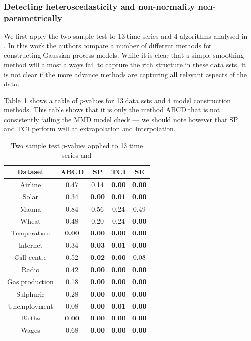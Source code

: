 \documentclass{article} %
\begin{document}
\subsubsection{Detecting heteroscedasticity and non-normality non-parametrically}

We first apply the two sample test to 13 time series and 4 algorithms analysed in .
In this work the authors compare a number of different methods for constructing Gaussian process models.
While it is clear that a simple smoothing method will almost always fail to capture the rich structure in these data sets, it is not clear if the more advance methods are capturing all relevant aspects of the data.

Table~\ref{table:ABCD-p-values} shows a table of $p$-values for 13 data sets and 4 model construction methods.
This table shows that it is only the method ABCD that is not consistently failing the MMD model check --- we should note however that SP and TCI perform well at extrapolation and interpolation.

\begin{table}[ht]
\center
\begin{tabular}{|c|c|c|c|c|}
\hline
Dataset & ABCD & SP & TCI & SE \\
\hline
Airline        & 0.47 & 0.14 & {\bf0.00} & {\bf0.00} \\
Solar          & 0.34 & {\bf0.00} & {\bf0.01} & {\bf0.00} \\
Mauna          & 0.84 & 0.56 & 0.24 & 0.49\\
Wheat          & 0.48 & 0.20 & 0.24 & {\bf0.00} \\
Temperature    & {\bf0.00} & {\bf0.00} & {\bf0.00} & {\bf0.00} \\
Internet       & 0.34 & {\bf0.03} & {\bf0.01} & {\bf0.00} \\
Call centre    & 0.52 & {\bf0.02} & {\bf0.00} & 0.08 \\
Radio          & 0.42 & {\bf0.00} & {\bf0.00} & {\bf0.00} \\
Gas production & 0.18 & {\bf0.00} & {\bf0.00} & {\bf0.00} \\
Sulphuric      & 0.28 & {\bf0.00} & {\bf0.00} & {\bf0.00} \\
Unemployment   & 0.08 & {\bf0.00} & {\bf0.01} & {\bf0.00} \\
Births         & {\bf0.00} & {\bf0.00} & {\bf0.00} & {\bf0.00} \\
Wages          & 0.68 & {\bf0.00} & {\bf0.00} & {\bf0.00} \\
\hline
\end{tabular}
\caption{Two sample test $p$-values applied to 13 time series and }
\label{table:ABCD-p-values}
\end{table}
\end{document}
